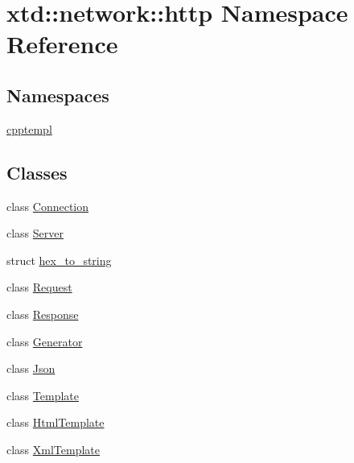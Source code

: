 \hypertarget{namespacextd_1_1network_1_1http}{\section{xtd\-:\-:network\-:\-:http Namespace Reference}
\label{namespacextd_1_1network_1_1http}
}
\subsection*{Namespaces}
\begin{DoxyCompactItemize}
\item 
\hyperlink{namespacextd_1_1network_1_1http_1_1cpptempl}{cpptempl}
\end{DoxyCompactItemize}
\subsection*{Classes}
\begin{DoxyCompactItemize}
\item 
class \hyperlink{classxtd_1_1network_1_1http_1_1Connection}{Connection}
\item 
class \hyperlink{classxtd_1_1network_1_1http_1_1Server}{Server}
\begin{DoxyCompactList}\small\item\em \par
\par
 \end{DoxyCompactList}\item 
struct \hyperlink{structxtd_1_1network_1_1http_1_1hex__to__string}{hex\-\_\-to\-\_\-string}
\item 
class \hyperlink{classxtd_1_1network_1_1http_1_1Request}{Request}
\item 
class \hyperlink{classxtd_1_1network_1_1http_1_1Response}{Response}
\item 
class \hyperlink{classxtd_1_1network_1_1http_1_1Generator}{Generator}
\item 
class \hyperlink{classxtd_1_1network_1_1http_1_1Json}{Json}
\item 
class \hyperlink{classxtd_1_1network_1_1http_1_1Template}{Template}
\item 
class \hyperlink{classxtd_1_1network_1_1http_1_1HtmlTemplate}{Html\-Template}
\item 
class \hyperlink{classxtd_1_1network_1_1http_1_1XmlTemplate}{Xml\-Template}
\end{DoxyCompactItemize}
